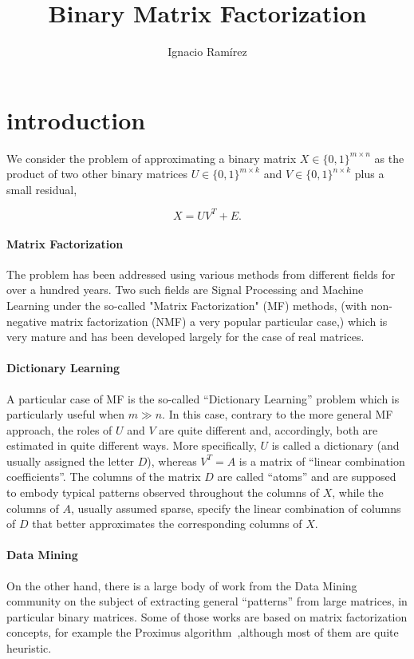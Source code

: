 \documentclass[a4paper,11pt]{report}
\title{Binary Matrix Factorization}
\author{Ignacio Ram\'{i}rez}
\begin{document}
\maketitle

\section*{introduction}

We consider the problem of approximating a binary matrix $X \in \{0,1\}^{m{\times}n}$ as the product of two other binary matrices $U \in \{0,1\}^{m{\times}k}$ and $V \in \{0,1\}^{n{\times}k}$ plus a small residual,

\begin{equation}
X = UV^T + E.
\label{eq:mf}
\end{equation}

\paragraph{Matrix Factorization} The problem   has been addressed using various methods from different fields for over a hundred years. Two such fields are Signal Processing and Machine Learning under the so-called "Matrix Factorization" (MF) methods, (with non-negative matrix factorization (NMF) a very popular particular case,) which is very mature and has been developed largely for the case of real matrices.

\paragraph{Dictionary Learning} A particular case of MF is the so-called ``Dictionary Learning'' problem which is particularly useful when $m \gg n$. In this case, contrary to the more general MF approach, the roles of $U$ and $V$ are quite different and, accordingly, both are estimated in quite different ways. More specifically, $U$ is called a dictionary (and usually assigned the letter $D$), whereas $V^T=A$ is a matrix of ``linear combination coefficients''. The columns of the matrix $D$ are called ``atoms'' and are supposed to embody typical patterns observed throughout the columns of $X$, while the columns of $A$, usually assumed sparse, specify the linear combination of columns of $D$ that better approximates the corresponding columns of $X$.

\paragraph{Data Mining} On the other hand, there is a large body of work from the Data Mining community on the subject of extracting general ``patterns'' from large matrices, in particular binary matrices. Some of those works are based on matrix factorization concepts, for example the Proximus algorithm~\cite{proximus},although most of them are quite heuristic.
\end{document}
